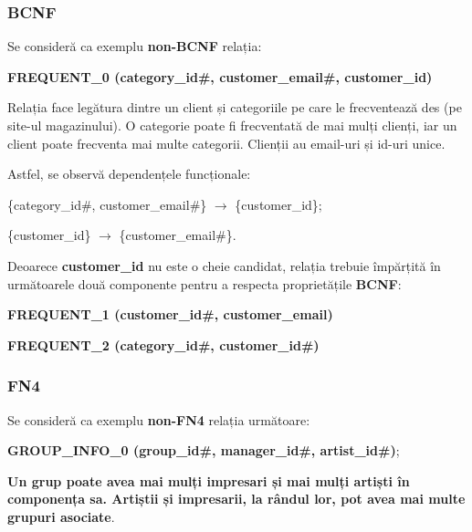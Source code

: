 \documentclass[a4paper, oneside, 12pt]{article}
\begin{document}
\subsubsection{\textbf{BCNF}}

Se consideră ca exemplu \textbf{non-BCNF} relația:

\begin{m_itemize}
        \item \textbf{FREQUENT\_0 (category\_id\#, customer\_email\#, customer\_id)}
\end{m_itemize}

Relația face legătura dintre un client și categoriile pe care le frecventează des (pe site-ul magazinului).
O categorie poate fi frecventată de mai mulți clienți, iar un client poate
frecventa mai multe categorii. Clienții au email-uri și id-uri unice.

Astfel, se observă dependențele funcționale:

\begin{m_itemize}
        \item \{category\_id\#, customer\_email\#\} $\rightarrow$ \{customer\_id\};
        \item \{customer\_id\} $\rightarrow$ \{customer\_email\#\}.
\end{m_itemize}

Deoarece \textbf{customer\_id} nu este o cheie candidat, relația trebuie
împărțită în următoarele două componente pentru a respecta proprietățile
\textbf{BCNF}:

\begin{m_itemize}
        \item \textbf{FREQUENT\_1 (customer\_id\#, customer\_email)}
        \item \textbf{FREQUENT\_2 (category\_id\#, customer\_id\#)}
\end{m_itemize}

\subsubsection{\textbf{FN4}}

Se consideră ca exemplu \textbf{non-FN4} relația următoare:

\begin{m_itemize}[after=]
        \item \textbf{GROUP\_INFO\_0 (group\_id\#, manager\_id\#, artist\_id\#)};
        \item \textbf{Un grup poate avea mai mulți impresari și mai mulți artiști în componența sa. Artiștii și impresarii, la rândul lor, pot avea mai multe grupuri asociate}.
\end{m_itemize}
\end{document}
